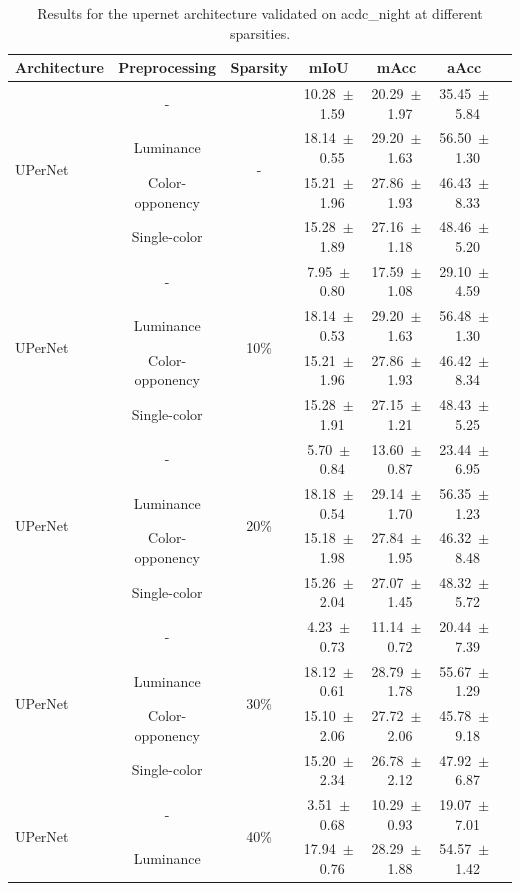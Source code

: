 \begin{table}[h]
\centering
\caption{Results for the upernet architecture validated on acdc_night at different sparsities.}
\begin{tabular}{@{}lccc ccc@{}}
\toprule
Architecture & Preprocessing & Sparsity & mIoU & mAcc & aAcc \\
\midrule

\multirow{4}{*}{UPerNet} & - & \multirow{4}{*}{-} & 10.28~$\pm$~1.59 & 20.29~$\pm$~1.97 & 35.45~$\pm$~5.84 \\
& Luminance & & 18.14~$\pm$~0.55 & 29.20~$\pm$~1.63 & 56.50~$\pm$~1.30 \\
& Color-opponency & & 15.21~$\pm$~1.96 & 27.86~$\pm$~1.93 & 46.43~$\pm$~8.33 \\
& Single-color & & 15.28~$\pm$~1.89 & 27.16~$\pm$~1.18 & 48.46~$\pm$~5.20 \\
\midrule
\multirow{4}{*}{UPerNet} & - & \multirow{4}{*}{10\%} & 7.95~$\pm$~0.80 & 17.59~$\pm$~1.08 & 29.10~$\pm$~4.59 \\
& Luminance & & 18.14~$\pm$~0.53 & 29.20~$\pm$~1.63 & 56.48~$\pm$~1.30 \\
& Color-opponency & & 15.21~$\pm$~1.96 & 27.86~$\pm$~1.93 & 46.42~$\pm$~8.34 \\
& Single-color & & 15.28~$\pm$~1.91 & 27.15~$\pm$~1.21 & 48.43~$\pm$~5.25 \\
\midrule
\multirow{4}{*}{UPerNet} & - & \multirow{4}{*}{20\%} & 5.70~$\pm$~0.84 & 13.60~$\pm$~0.87 & 23.44~$\pm$~6.95 \\
& Luminance & & 18.18~$\pm$~0.54 & 29.14~$\pm$~1.70 & 56.35~$\pm$~1.23 \\
& Color-opponency & & 15.18~$\pm$~1.98 & 27.84~$\pm$~1.95 & 46.32~$\pm$~8.48 \\
& Single-color & & 15.26~$\pm$~2.04 & 27.07~$\pm$~1.45 & 48.32~$\pm$~5.72 \\
\midrule
\multirow{4}{*}{UPerNet} & - & \multirow{4}{*}{30\%} & 4.23~$\pm$~0.73 & 11.14~$\pm$~0.72 & 20.44~$\pm$~7.39 \\
& Luminance & & 18.12~$\pm$~0.61 & 28.79~$\pm$~1.78 & 55.67~$\pm$~1.29 \\
& Color-opponency & & 15.10~$\pm$~2.06 & 27.72~$\pm$~2.06 & 45.78~$\pm$~9.18 \\
& Single-color & & 15.20~$\pm$~2.34 & 26.78~$\pm$~2.12 & 47.92~$\pm$~6.87 \\
\midrule
\multirow{4}{*}{UPerNet} & - & \multirow{4}{*}{40\%} & 3.51~$\pm$~0.68 & 10.29~$\pm$~0.93 & 19.07~$\pm$~7.01 \\
& Luminance & & 17.94~$\pm$~0.76 & 28.29~$\pm$~1.88 & 54.57~$\pm$~1.42 \\

\end{tabular}
\end{table}
